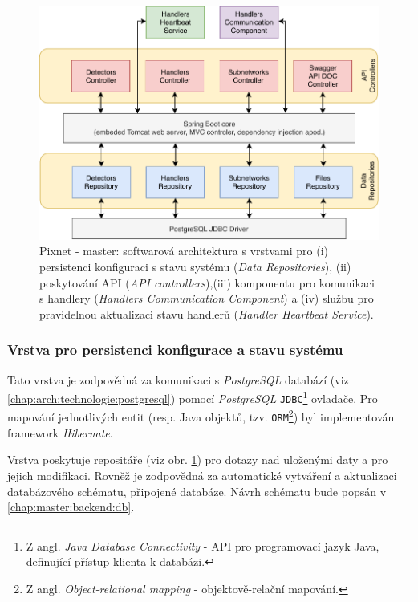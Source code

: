 \begin{figure}[h]
	\begin{center}
		\vspace*{0.4cm}
		\includegraphics[width=14cm]{figures/master_arch.pdf}
		\caption{Pixnet - master: softwarová architektura s vrstvami pro (i) persistenci konfiguraci s stavu systému (\textit{Data Repositories}), (ii) poskytování API (\textit{API controllers}),(iii) komponentu pro komunikaci s handlery (\textit{Handlers Communication Component}) a (iv) službu pro pravidelnou aktualizaci stavu handlerů (\textit{Handler Heartbeat Service}).}
		\label{fig:master:arch}
	\end{center}
\end{figure}

\subsubsection{Vrstva pro persistenci konfigurace a stavu systému}
Tato vrstva je zodpovědná za komunikaci s \textit{PostgreSQL} databází (viz \ref{chap:arch:technologie:postgresql}) pomocí \textit{PostgreSQL} \texttt{JDBC}\footnote{Z angl. \textit{Java Database Connectivity} - API pro programovací jazyk Java, definující přístup klienta k databázi.} ovladače. Pro mapování jednotlivých entit (resp. Java objektů, tzv. \texttt{ORM}\footnote{Z angl. \textit{Object-relational mapping} - objektově-relační mapování.}) byl implementován framework \textit{Hibernate}.

Vrstva poskytuje repositáře (viz obr. \ref{fig:master:arch}) pro dotazy nad uloženými daty a pro jejich modifikaci. Rovněž je zodpovědná za automatické vytváření a aktualizaci databázového schématu, připojené databáze. Návrh schématu bude popsán v \ref{chap:master:backend:db}.

